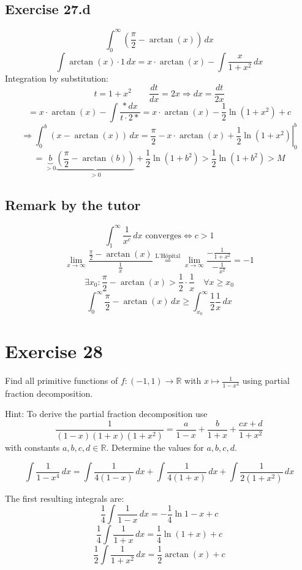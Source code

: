 \documentclass[a4paper]{article}
\theoremstyle{definition}
\begin{document}
\subsection{Exercise 27.d}
\[ \int_0^\infty \left(\frac\pi2 - \arctan(x)\right) \, dx \]
\[ \int \arctan(x) \cdot 1 \, dx = x \cdot \arctan(x) - \int \frac{x}{1 + x^2} \, dx \]
Integration by substitution:
\[ t = 1 + x^2 \qquad \frac{dt}{dx} = 2x \Rightarrow dx = \frac{dt}{2x} \]
\[ = x \cdot \arctan(x) - \int \frac{* \, dx}{t \cdot 2*} = x \cdot \arctan(x) - \frac{1}{2} \ln(1 + x^2) + c \]
\[ \Rightarrow \int_0^b (x - \arctan(x)) \, dx = \left.\frac\pi2 - x \cdot \arctan(x) + \frac12 \ln(1 + x^2) \right|_0^b \]
\[
  = \underbrace{b}_{>0} \underbrace{\left(\frac\pi2 - \arctan(b)\right)}_{>0} + \frac12 \ln(1 + b^2)
  > \frac12 \ln(1 + b^2) > M
\]

\subsection{Remark by the tutor}
\[ \int_1^\infty \frac{1}{x^c} \, dx \text{ converges} \iff c > 1 \]
\[
  \lim_{x\to\infty} \frac{\frac\pi2 - \arctan(x)}{\frac1x}
  \overset{\text{L'H\^opital}}{=}
  \lim_{x\to\infty} \frac{-\frac{1}{1 + x^2}}{-\frac{1}{x^2}} = -1
\] \[
  \exists x_0: \frac{\pi}{2} - \arctan(x) > \frac12 \cdot \frac1x
  \quad \forall x \geq x_0
\] \[
  \int_0^\infty \frac{\pi}{2} - \arctan(x) \, dx \geq \int_{x_0}^\infty \frac12 \frac1x \, dx
\]

\section{Exercise 28}
\begin{ex}
  Find all primitive functions of $f: (-1, 1) \to \mathbb R$ with $x \mapsto \frac{1}{1 - x^4}$ using partial fraction decomposition.

  Hint: To derive the partial fraction decomposition use
  \[ \frac{1}{(1 - x)(1 + x)(1 + x^2)} = \frac{a}{1 - x} + \frac{b}{1 + x} + \frac{cx + d}{1 + x^2} \]
  with constants $a,b,c,d \in \mathbb R$. Determine the values for $a,b,c,d$.
\end{ex}

\[ \int \frac{1}{1 - x^4} \, dx = \int \frac{1}{4(1 - x)} \, dx + \int \frac{1}{4(1 + x)} \, dx + \int \frac{1}{2(1 + x^2)} \, dx \]

The first resulting integrals are:
\[ \frac14 \int \frac{1}{1 - x} \, dx = -\frac14 \ln{1 - x} + c \]
\[ \frac14 \int \frac{1}{1 + x} \, dx = \frac14 \ln(1 + x) + c \]
\[ \frac12 \int \frac{1}{1 + x^2} \, dx = \frac12 \arctan(x) + c \]
\end{document}
